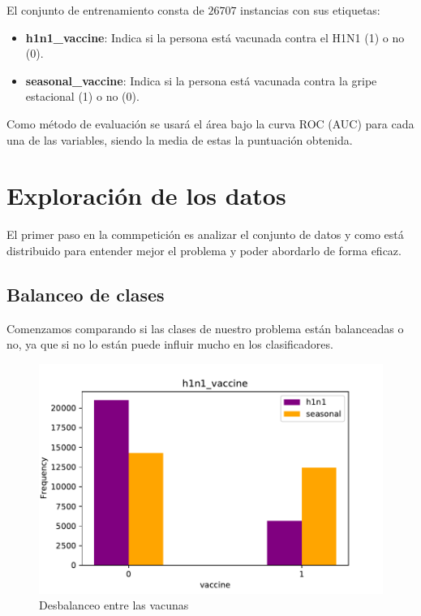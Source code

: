 \documentclass[twoside,openright,titlepage,numbers=noenddot,openany,headinclude,footinclude=true,
cleardoublepage=empty,abstractoff,BCOR=5mm,paper=a4,fontsize=12pt,main=spanish]{scrreprt}
\begin{document}
El conjunto de entrenamiento consta de $26707$ instancias con sus etiquetas:

\begin{itemize}
\item \textbf{h1n1\_vaccine}: Indica si la persona está vacunada contra el H1N1 (1) o no (0).
\item \textbf{seasonal\_vaccine}: Indica si la persona está vacunada contra la gripe estacional (1) o no (0).
\end{itemize}

Como método de evaluación se usará el área bajo la curva ROC (AUC) para cada una de las variables, siendo la media de estas la puntuación obtenida.

\newpage
\section{Exploración de los datos}

El primer paso en la commpetición es analizar el conjunto de datos y como está distribuido para entender mejor el problema y poder abordarlo de forma eficaz.

\subsection{Balanceo de clases}

Comenzamos comparando si las clases de nuestro problema están balanceadas o no, ya que si no lo están puede influir mucho en los clasificadores.

\begin{figure}[H]
\includegraphics[scale=1]{desbalanceo.pdf}
\caption{Desbalanceo entre las vacunas}
\label{desbalanceo}
\end{figure}
\end{document}
